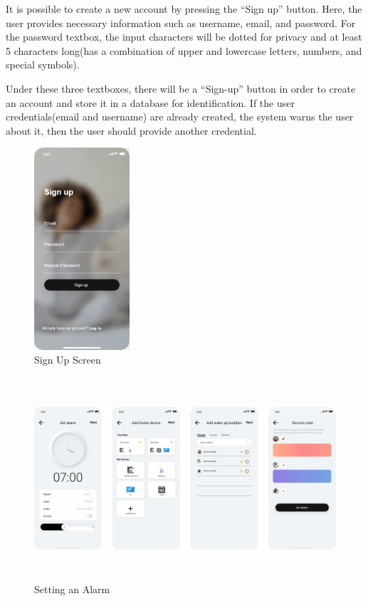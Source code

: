 \documentclass[conference]{IEEEtran}
\begin{document}
\begin{enumerate}
   
    It is possible to create a new account by pressing the “Sign up” button. Here, the user provides necessary information such as username, email, and password. For the password textbox, the input characters will be dotted for privacy and at least 5 characters long(has a combination of upper and lowercase letters, numbers, and special symbols). 
    \par Under these three textboxes, there will be a “Sign-up” button in order to create an account and store it in a database for identification. If the user credentials(email and username) are already created, the system warns the user about it, then the user should provide another credential.
    
     \begin{figure}[htbp]
        \centerline{\includegraphics[height=75mm,scale=0.5]{Images/Design_Signup.png}}
        \caption{Sign Up Screen}
        \label{fig}
    \end{figure}
    
\end{enumerate}



\begin{figure}[!b]
    \centerline{\includegraphics[height=75mm,scale=1]{Images/settingAlarm.png}}
    \caption{Setting an Alarm}
    \label{fig}  
\end{figure}
\end{document}
